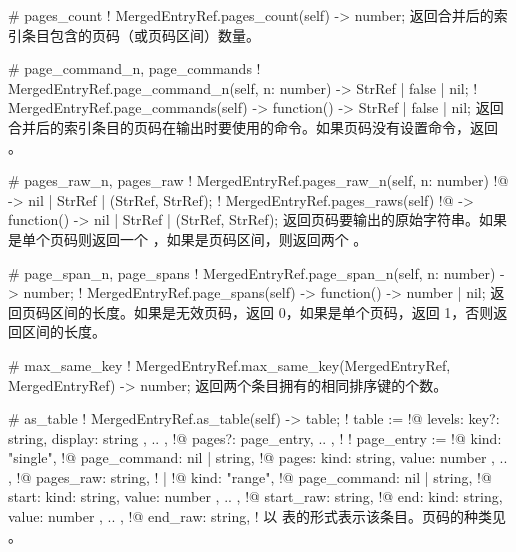 \documentclass[class=article,doc={kv-usage}]{cusdoc}
\newcommand*\LUA{\texorpdfstring{\textcon{lua}}{lua}}
\begin{document}
\begin{luadoc*}{}
# pages_count
! MergedEntryRef.pages_count(self) -> number;
返回合并后的索引条目包含的页码（或页码区间）数量。
\end{luadoc*}

\begin{luadoc*}{}
# page_command_n, page_commands
! MergedEntryRef.page_command_n(self, n: number) -> StrRef | false | nil;
! MergedEntryRef.page_commands(self) -> function() -> StrRef | false | nil;
返回合并后的索引条目的页码在输出时要使用的命令。如果页码没有设置命令，返回 。
\end{luadoc*}

\begin{luadoc*}{}
# pages_raw_n, pages_raw
! MergedEntryRef.pages_raw_n(self, n: number)
!@                          -> nil | StrRef | (StrRef, StrRef);
! MergedEntryRef.pages_raws(self)
!@            -> function() -> nil | StrRef | (StrRef, StrRef);
返回页码要输出的原始字符串。如果是单个页码则返回一个 ，如果是页码区间，则返回两个 。
\end{luadoc*}

\begin{luadoc*}{}
# page_span_n, page_spans
! MergedEntryRef.page_span_n(self, n: number) -> number;
! MergedEntryRef.page_spans(self) -> function() -> number | nil;
返回页码区间的长度。如果是无效页码，返回 0，如果是单个页码，返回 1，否则返回区间的长度。
\end{luadoc*}

\begin{luadoc*}{}
# max_same_key
! MergedEntryRef.max_same_key(MergedEntryRef, MergedEntryRef) -> number;
返回两个条目拥有的相同排序键的个数。
\end{luadoc*}

\begin{luadoc*}{}
# as_table
! MergedEntryRef.as_table(self) -> table;
! table := {
!@  levels: { { key?: string, display: string }, .. },
!@  pages?: { page_entry, .. },
! }
! page_entry := {
!@  kind: "single",
!@  page_command: nil | string,
!@  pages: { { kind: string, value: number }, .. },
!@  pages_raw: string,
! } | {
!@  kind: "range",
!@  page_command: nil | string,
!@  start: { { kind: string, value: number }, .. },
!@  start_raw: string,
!@  end: { { kind: string, value: number }, .. },
!@  end_raw: string,
! }
以 \LUA 表的形式表示该条目。页码的种类见 。
\end{luadoc*}
\end{document}
